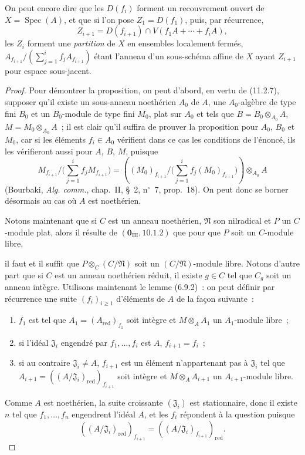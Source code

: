 On peut encore dire que les $D(f_i)$ forment un recouvrement ouvert de
$X=\operatorname{Spec}(A)$, et que si l'on pose $Z_1=D(f_1)$, puis, par
récurrence,
\[
Z_{i+1}=D(f_{i+1})\cap V(f_1A+\cdots+f_iA),
\]
les $Z_i$ forment une \emph{partition} de $X$ en ensembles localement fermés,
$A_{f_{i+1}}/(\sum_{j=1}^{i}f_jA_{f_{i+1}})$ étant l'anneau d'un sous-schéma
affine de $X$ ayant $Z_{i+1}$ pour espace sous-jacent.

\begin{proof}
Pour démontrer la proposition, on peut d'abord, en vertu de (11.2.7), supposer
qu'il existe un sous-anneau noethérien $A_0$ de $A$, une $A_0$-algèbre de type
fini $B_0$ et un $B_0$-module de type fini $M_0$, plat sur $A_0$ et tels que
$B=B_0\otimes_{A_0}A$, $M=M_0\otimes_{A_0}A$~; il est clair qu'il suffira de
prouver la proposition pour $A_0$, $B_0$ et $M_0$, car si les éléments
$f_i\in A_0$ vérifient dans ce cas les conditions de l'énoncé, ils les
vérifieront aussi pour $A$, $B$, $M$, puisque
\[
M_{f_{i+1}}\Big/\Big(\sum_{j=1}^{i}f_jM_{f_{i+1}}\Big)
=\left((M_0)_{f_{i+1}}\Big/\Big(\sum_{j=1}^{i}f_j(M_0)_{f_{i+1}}\Big)\right)
\otimes_{A_0}A
\]
(Bourbaki, \emph{Alg. comm.}, chap.~II, \S~2, n$^\circ$~7, prop.~18). On
peut donc se borner désormais au cas où $A$ est noethérien.

Notons maintenant que si $C$ est un anneau noethérien, $\mathfrak N$ son
nilradical et $P$ un $C$-module plat, alors il résulte de
$(\mathbf 0_{\mathrm{III}},10.1.2)$ que pour que $P$ soit un $C$-module libre,


il faut et il suffit que $P\otimes_C(C/\mathfrak N)$ soit un
$(C/\mathfrak N)$-module libre. Notons d'autre part que si $C$ est un anneau
noethérien réduit, il existe $g\in C$ tel que $C_g$ soit un anneau intègre.
Utilisons maintenant le lemme (6.9.2)~: on peut définir par récurrence une suite
$(f_i)_{i\geq1}$ d'éléments de $A$ de la façon suivante~:
\begin{enumerate}
\item[$1^\circ$] $f_1$ est tel que $A_1=(A_{\mathrm{red}})_{f_1}$ soit
intègre et $M\otimes_A A_1$ un $A_1$-module libre~;
\item[$2^\circ$] si l'idéal $\mathfrak J_i$ engendré par $f_1,\ldots,f_i$
est $A$, $f_{i+1}=f_i$~;
\item[$3^\circ$] si au contraire $\mathfrak J_i\neq A$, $f_{i+1}$ est un
élément n'appartenant pas à $\mathfrak J_i$ tel que
$A_{i+1}=((A/\mathfrak J_i)_{\mathrm{red}})_{f_{i+1}}$ soit intègre et
$M\otimes_A A_{i+1}$ un $A_{i+1}$-module libre.
\end{enumerate}
Comme $A$ est noethérien, la suite croissante $(\mathfrak J_i)$ est
stationnaire, donc il existe $n$ tel que $f_1,\ldots,f_n$ engendrent l'idéal
$A$, et les $f_i$ répondent à la question puisque
\[
((A/\mathfrak J_i)_{\mathrm{red}})_{f_{i+1}}
=((A/\mathfrak J_i)_{f_{i+1}})_{\mathrm{red}}.
\]
\end{proof}

